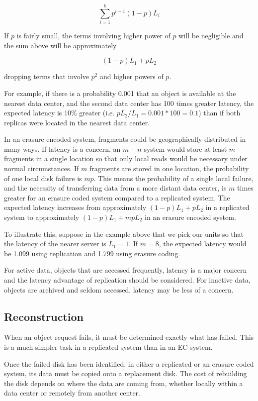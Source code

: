 \documentclass[11pt]{article}
\begin{document}
\[ \sum_{i=1}^k p^{i-1}(1-p) L_i \]

If $p$ is fairly small, the terms involving higher power of $p$ will be negligible and the sum above will be approximately

\[ (1-p)L_1 + p L_2\]

dropping terms that involve $p^2$ and higher powers of $p$.

For example, if there is a probability 0.001 that an object is available at the nearest data center, and the second data center has 100 times greater latency, the expected latency is 10\% greater (i.e. $p L_2/L_1 = 0.001*100 = 0.1$) than if both replicas were located in the nearest data center.

In an erasure encoded system, fragments could be geographically distributed in many ways. If latency is a concern, an $m+n$ system would store at least $m$ fragments in a single location so that only local reads would be necessary under normal circumstances. If $m$ fragments are stored in one location, the probability of one local disk failure is $mp$. This means the probability of a single local failure, and the necessity of transferring data from a more distant data center, is $m$ times greater for an erasure coded system compared to a replicated system. The expected latency increases from approximately $(1-p)L_1 + pL_2$ in a replicated system to approximately $(1-p)L_1 + mpL_2$ in an erasure encoded system. 

To illustrate this, suppose in the example above that we pick our units so that the latency of the nearer server is $L_1 = 1$. If $m = 8$, the expected latency would be 
1.099 using replication and
1.799 using erasure coding. 

For active data, objects that are accessed frequently, latency is a major concern and the latency advantage of replication should be considered. For inactive data, objects are archived and seldom accessed, latency may be less of a concern.

\subsection{Reconstruction}

When an object request fails, it must be determined exactly what has failed. This is a much simpler task in a replicated system than in an EC system.

Once the failed disk has been identified, in either a replicated or an erasure coded system, its data must be copied onto a replacement disk. The cost of rebuilding the disk depends on where the data are coming from, whether locally within a data center or remotely from another center. 
\end{document}
